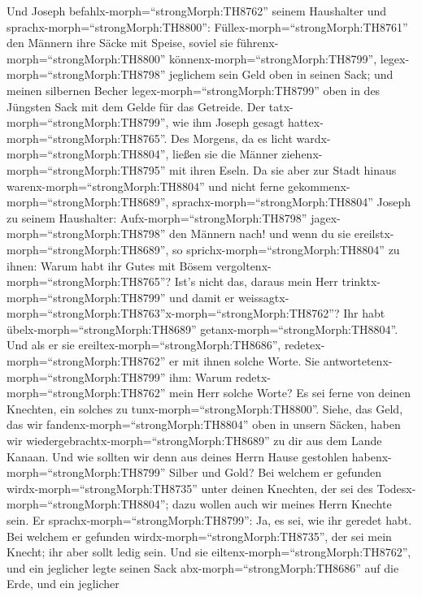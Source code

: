  Und Joseph befahlx-morph=``strongMorph:TH8762'' seinem
Haushalter und sprachx-morph=``strongMorph:TH8800'':
Füllex-morph=``strongMorph:TH8761'' den Männern ihre Säcke mit Speise,
soviel sie führenx-morph=``strongMorph:TH8800''
könnenx-morph=``strongMorph:TH8799'', legex-morph=``strongMorph:TH8798''
jeglichem sein Geld oben in seinen Sack;  und meinen
silbernen Becher legex-morph=``strongMorph:TH8799'' oben in des Jüngsten
Sack mit dem Gelde für das Getreide. Der
tatx-morph=``strongMorph:TH8799'', wie ihm Joseph gesagt
hattex-morph=``strongMorph:TH8765''.  Des Morgens, da es
licht wardx-morph=``strongMorph:TH8804'', ließen sie die Männer
ziehenx-morph=``strongMorph:TH8795'' mit ihren Eseln.  Da
sie aber zur Stadt hinaus warenx-morph=``strongMorph:TH8804'' und nicht
ferne gekommenx-morph=``strongMorph:TH8689'',
sprachx-morph=``strongMorph:TH8804'' Joseph zu seinem Haushalter:
Aufx-morph=``strongMorph:TH8798'' jagex-morph=``strongMorph:TH8798'' den
Männern nach! und wenn du sie ereilstx-morph=``strongMorph:TH8689'', so
sprichx-morph=``strongMorph:TH8804'' zu ihnen: Warum habt ihr Gutes mit
Bösem vergoltenx-morph=``strongMorph:TH8765''?  Ist's nicht
das, daraus mein Herr trinktx-morph=``strongMorph:TH8799'' und damit er
weissagtx-morph=``strongMorph:TH8763''x-morph=``strongMorph:TH8762''?
Ihr habt übelx-morph=``strongMorph:TH8689''
getanx-morph=``strongMorph:TH8804''.  Und als er sie
ereiltex-morph=``strongMorph:TH8686'',
redetex-morph=``strongMorph:TH8762'' er mit ihnen solche Worte.
 Sie antwortetenx-morph=``strongMorph:TH8799'' ihm: Warum
redetx-morph=``strongMorph:TH8762'' mein Herr solche Worte? Es sei ferne
von deinen Knechten, ein solches zu tunx-morph=``strongMorph:TH8800''.
 Siehe, das Geld, das wir
fandenx-morph=``strongMorph:TH8804'' oben in unsern Säcken, haben wir
wiedergebrachtx-morph=``strongMorph:TH8689'' zu dir aus dem Lande
Kanaan. Und wie sollten wir denn aus deines Herrn Hause gestohlen
habenx-morph=``strongMorph:TH8799'' Silber und Gold?  Bei
welchem er gefunden wirdx-morph=``strongMorph:TH8735'' unter deinen
Knechten, der sei des Todesx-morph=``strongMorph:TH8804''; dazu wollen
auch wir meines Herrn Knechte sein.  Er
sprachx-morph=``strongMorph:TH8799'': Ja, es sei, wie ihr geredet habt.
Bei welchem er gefunden wirdx-morph=``strongMorph:TH8735'', der sei mein
Knecht; ihr aber sollt ledig sein.  Und sie
eiltenx-morph=``strongMorph:TH8762'', und ein jeglicher legte seinen
Sack abx-morph=``strongMorph:TH8686'' auf die Erde, und ein jeglicher
